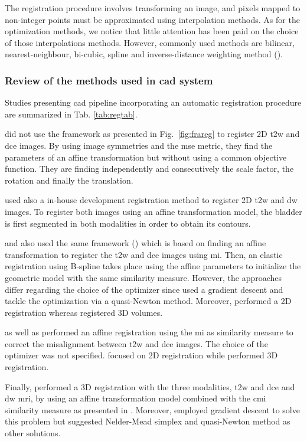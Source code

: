 The registration procedure involves transforming an image, and pixels mapped to non-integer points must be approximated using interpolation methods. As for the optimization methods, we notice that little attention has been paid on the choice of those interpolations methods. However, commonly used methods are bilinear, nearest-neighbour, bi-cubic, spline and inverse-distance weighting method (\cite{Mitra2012}).

\subsubsection{Review of the methods used in \ac{cad} system}\label{subsubsec:regrev}

Studies presenting \ac{cad} pipeline incorporating an automatic registration procedure are summarized in Tab. \ref{tab:regtab}. 

\cite{Ampeliotis2007,Ampeliotis2008} did not use the framework as presented in Fig.~\ref{fig:frareg} to register 2D \ac{t2w} and \ac{dce} images. By using image symmetries and the \ac{mse} metric, they find the parameters of an affine transformation but without using a common objective function. They are finding independently and consecutively the scale factor, the rotation and finally the translation.

\cite{Giannini2013} used also a in-house development registration method to register 2D \ac{t2w} and \ac{dw} images. To register both images using an affine transformation model, the bladder is first segmented in both modalities in order to obtain its contours.

\cite{Giannini2013} and also \cite{Vos2010} used the same framework (\cite{Rueckert1999}) which is based on finding an affine transformation to register the \ac{t2w} and \ac{dce} images using \ac{mi}. Then, an elastic registration using B-spline takes place using the affine parameters to initialize the geometric model with the  same similarity measure. However, the approaches differ regarding the choice of the optimizer since \cite{Giannini2013} used a gradient descent and \cite{Vos2010} tackle the optimization via a quasi-Newton method. Moreover, \cite{Giannini2013} performed a 2D registration whereas \cite{Vos2010} registered 3D volumes.

\cite{Viswanath2008a,Viswanath2009} as well as \cite{Vos2008} performed an affine registration using the \ac{mi} as similarity measure to correct the misalignment between \ac{t2w} and \ac{dce} images. The choice of the optimizer was not specified. \cite{Viswanath2008a,Viswanath2009} focused on 2D registration while \cite{Vos2008} performed 3D registration.

Finally, \cite{Viswanath2011} performed a 3D registration with the three modalities, \ac{t2w} and \ac{dce} and \ac{dw} \ac{mri}, by using an affine transformation model combined with the \ac{cmi} similarity measure as presented in \cite{Chappelow2011}. Moreover, \cite{Chappelow2011} employed gradient descent to solve this problem but suggested Nelder-Mead simplex and quasi-Newton method as other solutions.